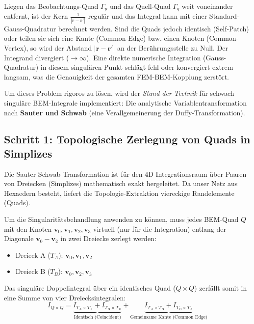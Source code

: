 \documentclass[11pt,a4paper]{article}
\begin{document}
Liegen das Beobachtungs-Quad $\Gamma_p$ und das Quell-Quad $\Gamma_q$ weit voneinander entfernt, ist der Kern $\frac{1}{|\bm{r} - \bm{r}'|}$ regulär und das Integral kann mit einer Standard-Gauss-Quadratur berechnet werden. 
Sind die Quads jedoch identisch (Self-Patch) oder teilen sie sich eine Kante (Common-Edge) bzw. einen Knoten (Common-Vertex), so wird der Abstand $|\bm{r} - \bm{r}'|$ an der Berührungsstelle zu Null. Der Integrand divergiert ($\to \infty$). Eine direkte numerische Integration (Gauss-Quadratur) in diesem singulären Punkt schlägt fehl oder konvergiert extrem langsam, was die Genauigkeit der gesamten FEM-BEM-Kopplung zerstört.

Um dieses Problem rigoros zu lösen, wird der \textit{Stand der Technik} für schwach singuläre BEM-Integrale implementiert: Die analytische Variablentransformation nach \textbf{Sauter und Schwab} (eine Verallgemeinerung der Duffy-Transformation).

\subsection{Schritt 1: Topologische Zerlegung von Quads in Simplizes}
Die Sauter-Schwab-Transformation ist für den 4D-Integrationsraum über Paaren von Dreiecken (Simplizes) mathematisch exakt hergeleitet. Da unser Netz aus Hexaedern besteht, liefert die Topologie-Extraktion viereckige Randelemente (Quads). 

Um die Singularitätsbehandlung anwenden zu können, muss jedes BEM-Quad $Q$ mit den Knoten $\bm{v}_0, \bm{v}_1, \bm{v}_2, \bm{v}_3$ virtuell (nur für die Integration) entlang der Diagonale $\bm{v}_0-\bm{v}_2$ in zwei Dreiecke zerlegt werden:
\begin{itemize}
    \item Dreieck A ($T_A$): $\bm{v}_0, \bm{v}_1, \bm{v}_2$
    \item Dreieck B ($T_B$): $\bm{v}_0, \bm{v}_2, \bm{v}_3$
\end{itemize}
Das singuläre Doppelintegral über ein identisches Quad ($Q \times Q$) zerfällt somit in eine Summe von vier Dreiecksintegralen:
\begin{equation}
    I_{Q \times Q} = \underbrace{I_{T_A \times T_A} + I_{T_B \times T_B}}_{\text{Identisch (Coincident)}} + \underbrace{I_{T_A \times T_B} + I_{T_B \times T_A}}_{\text{Gemeinsame Kante (Common Edge)}}
\end{equation}
\end{document}
